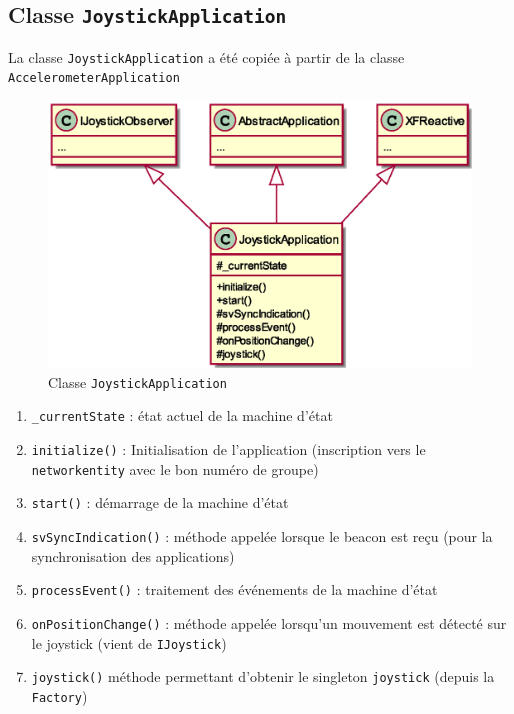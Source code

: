 \documentclass[DeseNET_Sebastien_Deriaz]{subfiles}
\begin{document}
\subsection{Classe \texttt{JoystickApplication}}
La classe \verb!JoystickApplication! a été copiée à partir de la classe \verb!AccelerometerApplication!
\begin{figure}[H]
\centering
\includegraphics[scale=0.5]{out/JoystickApplication.eps}
\caption{Classe \texttt{JoystickApplication}}
\end{figure}
\begin{enumerate}
\item \verb!_currentState! : état actuel de la machine d'état
\item \verb!initialize()! : Initialisation de l'application (inscription vers le \verb!networkentity! avec le bon numéro de groupe)
\item \verb!start()! : démarrage de la machine d'état
\item \verb!svSyncIndication()! : méthode appelée lorsque le beacon est reçu (pour la synchronisation des applications)
\item \verb!processEvent()! : traitement des événements de la machine d'état
\item \verb!onPositionChange()! : méthode appelée lorsqu'un mouvement est détecté sur le joystick (vient de \verb!IJoystick!)
\item \verb!joystick()! méthode permettant d'obtenir le singleton \verb!joystick! (depuis la \verb!Factory!)
\end{enumerate}
\end{document}
